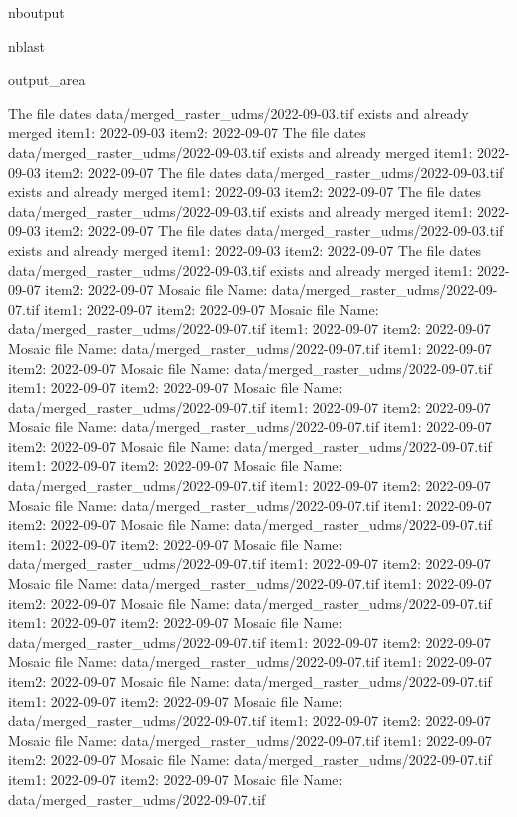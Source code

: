 \documentclass[letterpaper,10pt]{sphinxmanual}
\begin{document}
\begin{sphinxuseclass}{nboutput}
\begin{sphinxuseclass}{nblast}
{\begin{sphinxuseclass}{output_area}
\begin{sphinxuseclass}{}
\begin{sphinxVerbatim}[commandchars=\\\{\}]
The file dates data/merged\_raster\_udms/2022-09-03.tif exists and already merged
item1:  2022-09-03
item2:  2022-09-07
The file dates data/merged\_raster\_udms/2022-09-03.tif exists and already merged
item1:  2022-09-03
item2:  2022-09-07
The file dates data/merged\_raster\_udms/2022-09-03.tif exists and already merged
item1:  2022-09-03
item2:  2022-09-07
The file dates data/merged\_raster\_udms/2022-09-03.tif exists and already merged
item1:  2022-09-03
item2:  2022-09-07
The file dates data/merged\_raster\_udms/2022-09-03.tif exists and already merged
item1:  2022-09-03
item2:  2022-09-07
The file dates data/merged\_raster\_udms/2022-09-03.tif exists and already merged
item1:  2022-09-07
item2:  2022-09-07
Mosaic file Name:  data/merged\_raster\_udms/2022-09-07.tif
item1:  2022-09-07
item2:  2022-09-07
Mosaic file Name:  data/merged\_raster\_udms/2022-09-07.tif
item1:  2022-09-07
item2:  2022-09-07
Mosaic file Name:  data/merged\_raster\_udms/2022-09-07.tif
item1:  2022-09-07
item2:  2022-09-07
Mosaic file Name:  data/merged\_raster\_udms/2022-09-07.tif
item1:  2022-09-07
item2:  2022-09-07
Mosaic file Name:  data/merged\_raster\_udms/2022-09-07.tif
item1:  2022-09-07
item2:  2022-09-07
Mosaic file Name:  data/merged\_raster\_udms/2022-09-07.tif
item1:  2022-09-07
item2:  2022-09-07
Mosaic file Name:  data/merged\_raster\_udms/2022-09-07.tif
item1:  2022-09-07
item2:  2022-09-07
Mosaic file Name:  data/merged\_raster\_udms/2022-09-07.tif
item1:  2022-09-07
item2:  2022-09-07
Mosaic file Name:  data/merged\_raster\_udms/2022-09-07.tif
item1:  2022-09-07
item2:  2022-09-07
Mosaic file Name:  data/merged\_raster\_udms/2022-09-07.tif
item1:  2022-09-07
item2:  2022-09-07
Mosaic file Name:  data/merged\_raster\_udms/2022-09-07.tif
item1:  2022-09-07
item2:  2022-09-07
Mosaic file Name:  data/merged\_raster\_udms/2022-09-07.tif
item1:  2022-09-07
item2:  2022-09-07
Mosaic file Name:  data/merged\_raster\_udms/2022-09-07.tif
item1:  2022-09-07
item2:  2022-09-07
Mosaic file Name:  data/merged\_raster\_udms/2022-09-07.tif
item1:  2022-09-07
item2:  2022-09-07
Mosaic file Name:  data/merged\_raster\_udms/2022-09-07.tif
item1:  2022-09-07
item2:  2022-09-07
Mosaic file Name:  data/merged\_raster\_udms/2022-09-07.tif
item1:  2022-09-07
item2:  2022-09-07
Mosaic file Name:  data/merged\_raster\_udms/2022-09-07.tif
item1:  2022-09-07
item2:  2022-09-07
Mosaic file Name:  data/merged\_raster\_udms/2022-09-07.tif
item1:  2022-09-07
item2:  2022-09-07
Mosaic file Name:  data/merged\_raster\_udms/2022-09-07.tif
item1:  2022-09-07
item2:  2022-09-07
Mosaic file Name:  data/merged\_raster\_udms/2022-09-07.tif

\end{sphinxVerbatim}
\end{sphinxuseclass}
\end{sphinxuseclass}}
\end{sphinxuseclass}
\end{sphinxuseclass}
\end{document}
